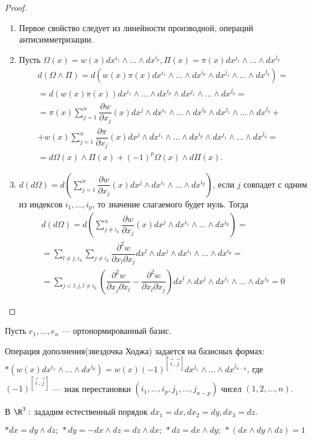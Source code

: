 \begin{proof} \ 
	\begin{enumerate}
		\item Первое свойство следует из линейности производной, операций  антисимметризации.
		\item Пусть $\Omega(x)=w(x)dx^{i_1}\wedge\ldots\wedge dx^{i_p}, \Pi(x)=\pi(x)dx^{j_1}\wedge\ldots\wedge dx^{j_q}$
		\begin{multline*}
			d(\Omega\wedge\Pi)=d(w(x)\pi(x)dx^{i_1}\wedge\ldots\wedge dx^{i_p}\wedge dx^{j_1}\wedge\ldots\wedge dx^{j_q})=\\=d(w(x)\pi(x))dx^{i_1}\wedge\ldots\wedge dx^{i_p}\wedge dx^{j_1}\wedge\ldots\wedge dx^{j_q}
			=\\=
			\pi(x)\sum\limits_{j=1}^n\dfrac{\partial w}{\partial x_j}(x)dx^j\wedge dx^{i_1}\wedge\ldots\wedge dx^{i_p}\wedge dx^{j_1}\wedge\ldots\wedge dx^{j_q}+\\+
			w(x)\sum\limits_{j=1}^n\dfrac{\partial \pi}{\partial x_j}(x)dx^j\wedge dx^{i_1}\wedge\ldots\wedge dx^{i_p}\wedge dx^{j_1}\wedge\ldots\wedge dx^{j_q}=\\=d\Omega(x)\wedge\Pi (x)+(-1)^p\Omega(x)\wedge d\Pi(x). 
		\end{multline*}
		\item $d(d\Omega)=d\left(\sum\limits_{j=1}^n\dfrac{\partial w}{\partial x_j}(x)dx^j\wedge dx^{i_1}\wedge\ldots\wedge dx^{i_p}\right)$, если $j$ совпадет с одним из индексов $i_1, \ldots, i_p$, то значение слагаемого будет нуль. Тогда
		\begin{multline*}
			d(d\Omega)=d\left(\sum\limits_{j\ne i_k}^n\dfrac{\partial w}{\partial x_j}(x)dx^j\wedge dx^{i_1}\wedge\ldots\wedge dx^{i_p}\right)=\\=\sum\limits_{l\ne j,i_k}\sum\limits_{j\ne i_k}\dfrac{\partial^2 w}{\partial x_l \partial x_j}dx^l\wedge dx^j\wedge dx^{i_1}\wedge\ldots\wedge  dx^{i_p}=\\=\sum\limits_{j<l; j,l\ne i_k} \left(\dfrac{\partial^2 w}{\partial x_j \partial x_l} - \dfrac{\partial^2 w}{\partial x_l \partial x_j}\right)dx^l\wedge dx^j\wedge dx^{i_1}\wedge\ldots\wedge  dx^{i_p}=0
		\end{multline*}
	\end{enumerate}
\end{proof}

Пусть $e_1, \ldots, e_n$ --- ортонормированный базис.

\begin{Def}
	Операция дополнения(звездочка Ходжа) задается на базисных формах: $*(w(x)dx^{i_1}\wedge\ldots\wedge dx^{i_p})=w(x)(-1)^{[\vec{i},\vec{j}]}dx^{j_1}\wedge\ldots\wedge dx^{j_{n-p}}$, где $(-1)^{[\vec{i}, \vec{j}]}$ --- знак перестановки $(i_1, \ldots, i_p, j_1, \ldots, j_{n-p})$ чисел $(1,2,\ldots, n)$.
	
	В $\R^3:$ зададим естественный порядок $ dx_1=dx, dx_2=dy, dx_3=dz$.
	
	$*dx = dy\wedge dz;\ *dy=-dx\wedge dz=dz\wedge dx;\ *dz=dx\wedge dy;\ *(dx\wedge dy\wedge dz)=1$
\end{Def}

